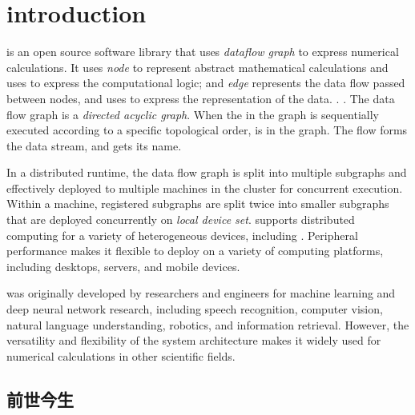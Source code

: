 \begin{savequote}[45mm]
\end{savequote}

\chapter{introduction} 
\label{ch:introduction}

\begin{content}

\tf{} is an open source software library that uses \emph{dataflow graph} to express numerical calculations. It uses \emph{node} to represent abstract mathematical calculations and uses  to express the computational logic; and \emph{edge} represents the data flow passed between nodes, and uses  to express the representation of the data. . . The data flow graph is a \emph{directed acyclic graph}. When the  in the graph is sequentially executed according to a specific topological order,  is in the graph. The flow forms the data stream, and \tf{} gets its name.

In a distributed runtime, the data flow graph is split into multiple subgraphs and effectively deployed to multiple machines in the cluster for concurrent execution. Within a machine, registered subgraphs are split twice into smaller subgraphs that are deployed concurrently on \emph{local device set}. \tf{} supports distributed computing for a variety of heterogeneous devices, including . \tf{}Peripheral performance makes it flexible to deploy on a variety of computing platforms, including desktops, servers, and mobile devices.

\tf{} was originally developed by  researchers and engineers for machine learning and deep neural network research, including speech recognition, computer vision, natural language understanding, robotics, and information retrieval. However, the versatility and flexibility of the \tf{} system architecture makes it widely used for numerical calculations in other scientific fields.

\end{content}

\section{前世今生}


